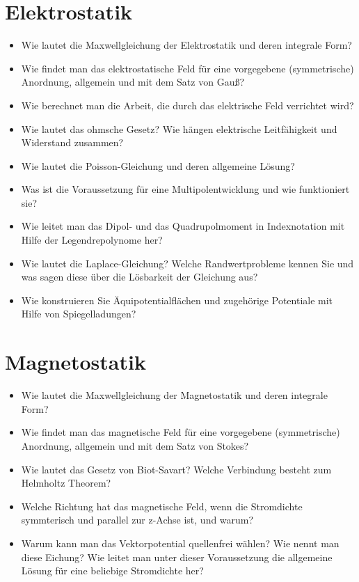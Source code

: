 \documentclass[german]{latex4ei/latex4ei_sheet}
\begin{document}
\section{Elektrostatik}
\begin{itemize}
	\item Wie lautet die Maxwellgleichung der Elektrostatik und deren integrale Form?
	\item Wie findet man das elektrostatische Feld für eine vorgegebene (symmetrische) Anordnung, allgemein und mit dem Satz von Gauß?
	\item Wie berechnet man die Arbeit, die durch das elektrische Feld verrichtet wird?
	\item Wie lautet das ohmsche Gesetz? Wie hängen elektrische Leitfähigkeit und Widerstand zusammen?
	\item Wie lautet die Poisson-Gleichung und deren allgemeine Lösung?
	\item Was ist die Voraussetzung für eine Multipolentwicklung und wie funktioniert sie?
	\item Wie leitet man das Dipol- und das Quadrupolmoment in Indexnotation mit Hilfe der Legendrepolynome her?
	\item Wie lautet die Laplace-Gleichung? Welche Randwertprobleme kennen Sie und was sagen diese über die Lösbarkeit der Gleichung aus?
	\item Wie konstruieren Sie Äquipotentialflächen und zugehörige Potentiale mit Hilfe von Spiegelladungen?
\end{itemize}
\section{Magnetostatik}
\begin{itemize}
	\item Wie lautet die Maxwellgleichung der Magnetostatik und deren integrale Form?
	\item Wie findet man das magnetische Feld für eine vorgegebene (symmetrische) Anordnung, allgemein und mit dem Satz von Stokes?
	\item Wie lautet das Gesetz von Biot-Savart? Welche Verbindung besteht zum Helmholtz Theorem?
	\item Welche Richtung hat das magnetische Feld, wenn die Stromdichte symmterisch und parallel zur z-Achse ist, und warum?
	\item Warum kann man das Vektorpotential quellenfrei wählen? Wie nennt man diese Eichung? Wie leitet man unter dieser Voraussetzung die allgemeine Lösung für eine beliebige Stromdichte her?
\end{itemize}
\end{document}
